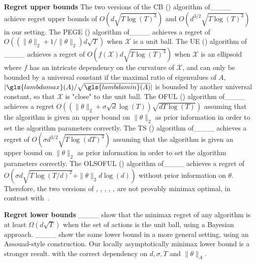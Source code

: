 \textbf{Regret upper bounds } The two versions of the \gls{CB} () algorithm of____ achieve regret upper bounds of $O( d \sqrt{ T \log(T)^{3} })$ and $O( d^{3/2} \sqrt{ T \log(T)^{3} })$ in our setting.
The \gls{PEGE} () algorithm of____ achieves a regret of $O( ( \|\theta\|_{2} + 1/\|\theta\|_{2} ) d \sqrt{T})$ when $\mathcal{X}$ is a unit ball. 
The \gls{UE} ()  algorithm of ____ achieves a regret of $O( f(\mathcal{X}) d \sqrt{T \log(T)^3})$ when $\mathcal{X}$ is an ellipsoid where $f$ has an intricate dependency on the curvature of $\mathcal{X}$, and can only be bounded by a universal constant if the maximal ratio of eigenvalues of $A$, $|\gls{lambdamax}(A)/\sqrt{\gls{lambdamin}(A)}|$ is bounded by another universal constant, so that $\mathcal{X}$ is "close" to the unit ball.
The \gls{OFUL} () algorithm of____ achieves a regret $O( (\|\theta\|_{2} + \sigma \sqrt{d} \log(T) ) \sqrt{d T \log(T)})$ assuming that the algorithm is given an upper bound on $\|\theta\|_{2}$ as prior information in order to set the algorithm parameters correctly. 
The \gls{TS} () algorithm of____ achieves a regret of $O( \sigma d^{3/2}\sqrt{T \log(dT)^3 })$ assuming that the algorithm is given an upper bound on $\|\theta\|_{2}$ as prior information in order to set the algorithm parameters correctly. 
The \gls{OLSOFUL} () algorithm of____ achieves a regret of $O( \sigma d \sqrt{ T \log(T/d)^2 } + \|\theta\|_{2}d \log(d) )$ without prior information on $\theta$. 
Therefore, the two versions of , , , , ,   are not provably minimax optimal, in contrast with~\nous.

\textbf{Regret lower bounds } ____ show that the minimax regret of any algorithm is at least $\Omega(d \sqrt{T})$ when the set of actions is the unit ball, using a Bayesian approach. 
____ show the same lower bound in a more general setting, using an Assouad-style construction. 
Our locally asymptotically minimax lower bound is a stronger result. with the correct
dependency on $d, \sigma, T$ and $\|\theta\|_{A}$. 


